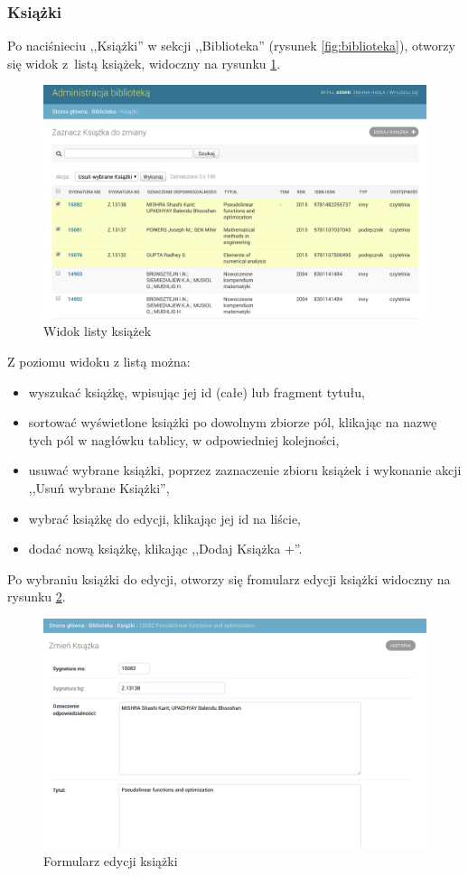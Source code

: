 \documentclass[twoside]{projektInzynierskiMS}
\begin{document}
\subsubsection{Książki}

Po naciśnieciu ,,Książki'' w sekcji ,,Biblioteka'' (rysunek \ref{fig:biblioteka}), otworzy się widok z~listą książek, widoczny na rysunku \ref{fig:adminBooks}. 

\begin{figure}[h]
  \centering
  \includegraphics[width=0.4\linewidth]{img/backend/ListaKsiazek.png}
  \caption{Widok listy książek}
  \label{fig:adminBooks}
\end{figure}

Z poziomu widoku z listą można:
\begin{itemize}
	\item wyszukać książkę, wpisując jej id (całe) lub fragment tytułu,
	\item sortować wyświetlone książki po dowolnym zbiorze pól, klikając na nazwę tych pól w nagłówku tablicy, w odpowiedniej kolejności,
	\item usuwać wybrane książki, poprzez zaznaczenie zbioru książek i wykonanie akcji ,,Usuń wybrane Książki'',
	\item wybrać książkę do edycji, klikając jej id na liście,
	\item dodać nową książkę, klikając ,,Dodaj Książka +''.
\end{itemize}

Po wybraniu książki do edycji, otworzy się fromularz edycji książki widoczny na rysunku \ref{fig:adminEditBook}.

\begin{figure}[h]
  \centering
  \includegraphics[width=0.4\linewidth]{img/backend/EdycjaKsiazki.png}
  \caption{Formularz edycji książki}
  \label{fig:adminEditBook}
\end{figure}
\end{document}
